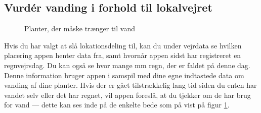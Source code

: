 \subsection{Vurdér vanding i forhold til lokalvejret}
\begin{minipage}{0.4\textwidth}
\begin{figure}[H]
    \centering
    \caption{Planter, der måske trænger til vand}
    \label{plants-to-water}
\end{figure}
\end{minipage} \hfill
\begin{minipage}{0.55\textwidth}
Hvis du har valgt at slå lokationsdeling til, kan du under vejrdata se hvilken placering appen henter data fra, samt hvornår appen sidst har registreret en regnvejrsdag. Du kan også se hvor mange mm regn, der er faldet på denne dag. Denne information bruger appen i samspil med dine egne indtastede data om vanding af dine planter. Hvis der er gået tilstrækkelig lang tid siden du enten har vandet selv eller det har regnet, vil appen foreslå, at du tjekker om de har brug for vand --- dette kan ses inde på de enkelte bede som på vist på figur \ref{plants-to-water}.
\end{minipage} 
